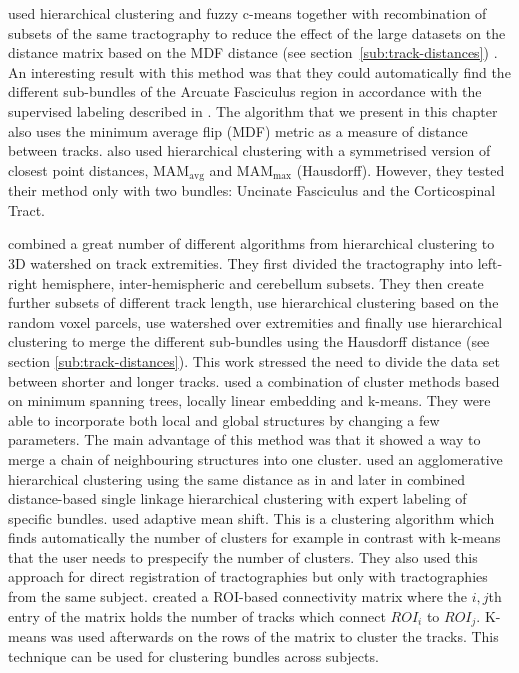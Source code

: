 \documentclass{bioinfo}
\begin{document}
\citet{Visser2010} used hierarchical clustering and fuzzy c-means
together with recombination of subsets of the same tractography to
reduce the effect of the large datasets on the distance matrix based on
the MDF distance (see section~\ref{sub:track-distances})
\citep{EGMB10}. An interesting result with this method was that they
could automatically find the different sub-bundles of the Arcuate
Fasciculus region in accordance with the supervised labeling described
in \citet{catani2005perisylvian}. The algorithm that we present in this
chapter also uses the minimum average flip (MDF) metric as a measure of
distance between tracks. \citet{gerig2004analysis} also
used hierarchical clustering with a symmetrised version of closest point
distances, $\mathrm{MA}\mathrm{M}_{\mathrm{avg}}$ and
$\mathrm{MA}\mathrm{M}_{\mathrm{max}}$ (Hausdorff). However, they tested
their method only with two bundles: Uncinate Fasciculus and the
Corticospinal Tract.

\citet{Guevara2010} combined a great number of different algorithms from
hierarchical clustering to 3D watershed on track extremities.  They
first divided the tractography into left-right hemisphere,
inter-hemispheric and cerebellum subsets. They then create further
subsets of different track length, use hierarchical clustering based on
the random voxel parcels, use watershed over extremities and finally use
hierarchical clustering to merge the different sub-bundles using the
Hausdorff distance (see section \ref{sub:track-distances}). This work
stressed the need to divide the data set between shorter and longer
tracks. \citet{Tsai2007} used a combination of cluster methods based on
minimum spanning trees, locally linear embedding and k-means.  They were
able to incorporate both local and global structures by changing a few
parameters. The main advantage of this method was that it showed a way
to merge a chain of neighbouring structures into one
cluster. \citet*{zhang2005dti} used an agglomerative hierarchical
clustering using the same distance as in \citet{zhang2003visualizing}
and later in \citet{zhang2008identifying} combined distance-based single
linkage hierarchical clustering with expert labeling of specific
bundles. \citet{zvitia2008adaptive, Zvitia2010} used adaptive mean
shift. This is a clustering algorithm which finds automatically the
number of clusters for example in contrast with k-means that the user
needs to prespecify the number of clusters.  They also used this
approach for direct registration of tractographies but only with
tractographies from the same subject.  created a
ROI-based connectivity matrix where the $i,j$th entry of the matrix
holds the number of tracks which connect $ROI_{i}$ to $ROI_{j}$. K-means
was used afterwards on the rows of the matrix to cluster the
tracks. This technique can be used for clustering bundles across
subjects.
\end{document}

